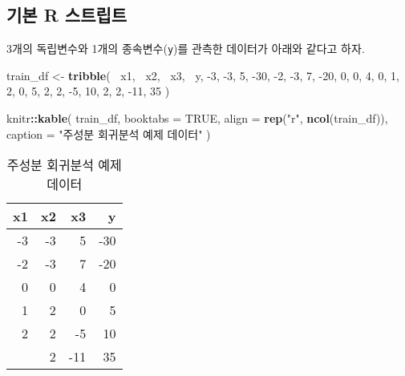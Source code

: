 \documentclass[]{book}
\newenvironment{Shaded}{\begin{snugshade}}{\end{snugshade}}
\newcommand{\DataTypeTok}[1]{\textcolor[rgb]{0.13,0.29,0.53}{#1}}
\newcommand{\DecValTok}[1]{\textcolor[rgb]{0.00,0.00,0.81}{#1}}
\newcommand{\KeywordTok}[1]{\textcolor[rgb]{0.13,0.29,0.53}{\textbf{#1}}}
\newcommand{\NormalTok}[1]{#1}
\newcommand{\OperatorTok}[1]{\textcolor[rgb]{0.81,0.36,0.00}{\textbf{#1}}}
\newcommand{\OtherTok}[1]{\textcolor[rgb]{0.56,0.35,0.01}{#1}}
\newcommand{\StringTok}[1]{\textcolor[rgb]{0.31,0.60,0.02}{#1}}
\begin{document}
\hypertarget{pcr-basic-script}{%
\subsection{기본 R 스트립트}\label{pcr-basic-script}}

3개의 독립변수와 1개의 종속변수(\texttt{y})를 관측한 데이터가 아래와 같다고 하자.

\begin{Shaded}
\begin{Highlighting}[]
\NormalTok{train_df <-}\StringTok{ }\KeywordTok{tribble}\NormalTok{(}
  \OperatorTok{~}\NormalTok{x1, }\OperatorTok{~}\NormalTok{x2, }\OperatorTok{~}\NormalTok{x3, }\OperatorTok{~}\NormalTok{y,}
  \DecValTok{-3}\NormalTok{, }\DecValTok{-3}\NormalTok{, }\DecValTok{5}\NormalTok{, }\DecValTok{-30}\NormalTok{,}
  \DecValTok{-2}\NormalTok{, }\DecValTok{-3}\NormalTok{, }\DecValTok{7}\NormalTok{, }\DecValTok{-20}\NormalTok{,}
  \DecValTok{0}\NormalTok{, }\DecValTok{0}\NormalTok{, }\DecValTok{4}\NormalTok{, }\DecValTok{0}\NormalTok{,}
  \DecValTok{1}\NormalTok{, }\DecValTok{2}\NormalTok{, }\DecValTok{0}\NormalTok{, }\DecValTok{5}\NormalTok{,}
  \DecValTok{2}\NormalTok{, }\DecValTok{2}\NormalTok{, }\DecValTok{-5}\NormalTok{, }\DecValTok{10}\NormalTok{,}
  \DecValTok{2}\NormalTok{, }\DecValTok{2}\NormalTok{, }\DecValTok{-11}\NormalTok{, }\DecValTok{35}
\NormalTok{)}

\NormalTok{knitr}\OperatorTok{::}\KeywordTok{kable}\NormalTok{(}
\NormalTok{  train_df, }\DataTypeTok{booktabs =} \OtherTok{TRUE}\NormalTok{,}
  \DataTypeTok{align =} \KeywordTok{rep}\NormalTok{(}\StringTok{"r"}\NormalTok{, }\KeywordTok{ncol}\NormalTok{(train_df)),}
  \DataTypeTok{caption =} \StringTok{"주성분 회귀분석 예제 데이터"}
\NormalTok{)}
\end{Highlighting}
\end{Shaded}

\begin{table}[t]

\caption{\label{tab:pcr-example-data}주성분 회귀분석 예제 데이터}
\centering
\begin{tabular}{rrrr}
\toprule
x1 & x2 & x3 & y\\
\midrule
-3 & -3 & 5 & -30\\
-2 & -3 & 7 & -20\\
0 & 0 & 4 & 0\\
1 & 2 & 0 & 5\\
2 & 2 & -5 & 10\\
\addlinespace
2 & 2 & -11 & 35\\
\bottomrule
\end{tabular}
\end{table}
\end{document}
